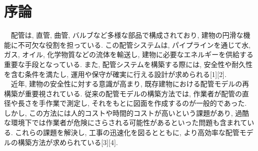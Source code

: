 \chapter{序論}
　配管は, 直管, 曲管, バルブなど多様な部品で構成されており, 建物の円滑な機能に不可欠な役割を担っている. 
この配管システムは, パイプラインを通じて水, ガス, オイル, 化学物質などの流体を輸送し, 建物に必要なエネルギーを供給する重要な手段となっている. 
また, 配管システムを構築する際には, 安全性や耐久性を含む条件を満たし, 運用や保守が確実に行える設計が求められる[1][2]. \\
　近年, 建物の安全性に対する意識が高まり, 既存建物における配管モデルの再構築が重要視されている. 
従来の配管モデルの構築方法では, 作業者が配管の直径や長さを手作業で測定し, それをもとに図面を作成するのが一般的であった. 
しかし, この方法には人的コストや時間的コストが高いという課題があり, 過酷な環境下では作業者が危険にさらされる可能性があるといった問題も含まれている. 
これらの課題を解決し, 工事の迅速化を図るとともに, より高効率な配管モデルの構築方法が求められている[3][4]. 

